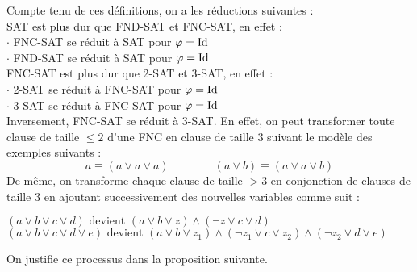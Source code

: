 		Compte tenu de ces définitions, on a les réductions suivantes : \\[2mm]
		\bdot \textsf{{SAT}} est plus dur que \textsf{{FND-SAT}} et \textsf{{FNC-SAT}}, en effet : \\
			\hspace*{5mm} \(\cdot\) \textsf{{FNC-SAT}} se réduit à \textsf{{SAT}} pour \(\varphi = \operatorname{Id}\) \\
			\hspace*{5mm} \(\cdot\) \textsf{{FND-SAT}} se réduit à \textsf{{SAT}} pour \(\varphi = \operatorname{Id}\) \\[2mm]
		\bdot \textsf{{FNC-SAT}} est plus dur que \textsf{{2-SAT}} et \textsf{{3-SAT}}, en effet : \\
			\hspace*{5mm} \(\cdot\) \textsf{2-SAT} se réduit à \textsf{FNC-SAT} pour \(\varphi = \operatorname{Id}\) \\
			\hspace*{5mm} \(\cdot\) \textsf{3-SAT} se réduit à \textsf{FNC-SAT} pour \(\varphi = \operatorname{Id}\) \\[2mm]
		\bdot Inversement, \textsf{FNC-SAT} se réduit à \textsf{3-SAT}. En effet, on peut transformer toute clause de taille \(\leq 2\) d'une FNC en clause de taille 3 suivant le modèle des exemples suivants :
			\[
				a \equiv (a \vee a \vee a) \qquad \qquad (a \vee b) \equiv (a \vee a \vee b)
			\]
		De même, on transforme chaque clause de taille \(> 3\) en conjonction de clauses de taille 3 en ajoutant successivement des nouvelles variables comme suit :
			\begin{center}
				\((a \vee b \vee c \vee d) \text{ devient } (a \vee b \vee z) \wedge (\neg z \vee c \vee d)\) \\
				\((a \vee b \vee c \vee d \vee e) \text{ devient } (a \vee b \vee z_1) \wedge (\neg z_1 \vee c \vee z_2) \wedge (\neg z_2 \vee d \vee e)\)
			\end{center}
		On justifie ce processus dans la proposition suivante.
